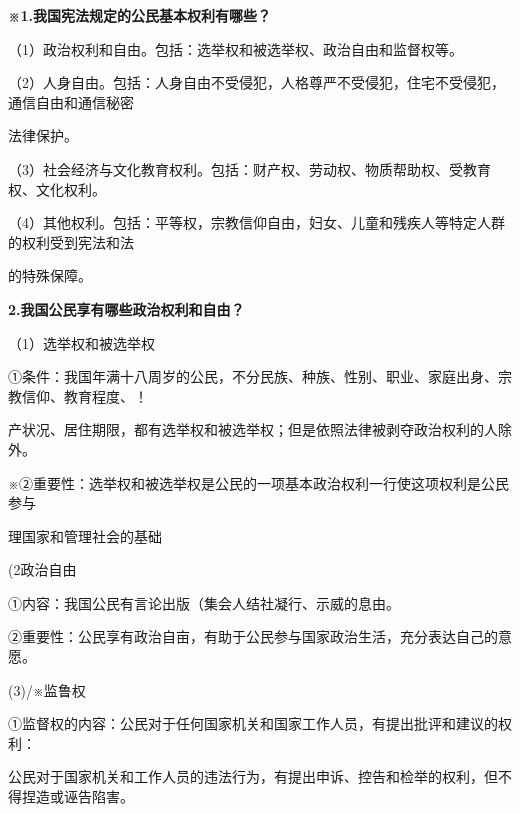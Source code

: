 \documentclass[lang=cn,11pt]{elegantbook}
\newcommand{\daofasym}[1]{{\daofasymbolfont #1}}
\newcommand{\daofasym}[1]{#1}
\begin{document}
\textbf{※1.我国宪法规定的公民基本权利有哪些？}\par

（1）政治权利和自由。包括：选举权和被选举权、政治自由和监督权等。\par

（2）人身自由。包括：人身自由不受侵犯，人格尊严不受侵犯，住宅不受侵犯，通信自由和通信秘密\par

法律保护。\par

（3）社会经济与文化教育权利。包括：财产权、劳动权、物质帮助权、受教育权、文化权利。\par

（4）其他权利。包括：平等权，宗教信仰自由，妇女、儿童和残疾人等特定人群的权利受到宪法和法\par

的特殊保障。\par

\textbf{2.我国公民享有哪些政治权利和自由？}\par

（1）选举权和被选举权\par

\daofasym{①}条件：我国年满十八周岁的公民，不分民族、种族、性别、职业、家庭出身、宗教信仰、教育程度、！\par

产状况、居住期限，都有选举权和被选举权；但是依照法律被剥夺政治权利的人除外。\par

※\daofasym{②}重要性：选举权和被选举权是公民的一项基本政治权利一行使这项权利是公民参与\par

理国家和管理社会的基础\par

(2政治自由\par

\daofasym{①}内容：我国公民有言论出版（集会人结社凝行、示威的息由。\par

\daofasym{②}重要性：公民享有政治自亩，有助于公民参与国家政治生活，充分表达自己的意愿。\par

(3)/※监鲁权\par

\daofasym{①}监督权的内容：公民对于任何国家机关和国家工作人员，有提出批评和建议的权利：\par

公民对于国家机关和工作人员的违法行为，有提出申诉、控告和检举的权利，但不得捏造或诬告陷害。\par
\end{document}
